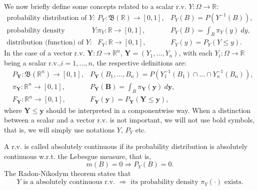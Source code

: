 We now briefly define some concepts related to a scalar r.v. $Y:\Omega\rightarrow\mathbb{R}$:
\begin{eqnarray*}
\text{probability distribution of }                      Y: & P_Y:  \mathfrak{B}(\mathbb{R})\rightarrow [0,1], & P_Y(B) = P(Y^{-1}(B)),       \\
\text{probability density (function), if it exists, of } Y: & \pi_Y:             \mathbb{R} \rightarrow [0,1], & P_Y(B) = \int_B \pi_Y(y)~dy, \\
\text{distribution (function) of }                       Y: & F_Y:               \mathbb{R} \rightarrow [0,1], & F_Y(y) = P_Y(Y\leqslant y).
\end{eqnarray*}
In the case of a vector r.v. $\mathbf{Y}:\Omega\rightarrow\mathbb{R}^n$, $\mathbf{Y}=(Y_1,\ldots,Y_n)$,
with each $Y_i:\Omega\rightarrow\mathbb{R}$ being a scalar r.v.,$i=1,\ldots,n$, the respective definitions are:
\begin{eqnarray*}
 & P_{\mathbf{Y}}:  \mathfrak{B}(\mathbb{R}^n)\rightarrow [0,1], & P_{\mathbf{Y}}(B_1,\ldots,B_n) = P(Y_1^{-1}(B_1)\cap\ldots\cap Y_n^{-1}(B_n)), \\
 & \pi_{\mathbf{Y}}:             \mathbb{R}^n \rightarrow [0,1], & P_{\mathbf{Y}}(\mathbf{B}) = \int_B \pi_{\mathbf{Y}}(\mathbf{y})~d\mathbf{y}, \\
 & F_{\mathbf{Y}}:               \mathbb{R}^n \rightarrow [0,1], & F_{\mathbf{Y}}(\mathbf{y}) = P_{\mathbf{Y}}(\mathbf{Y}\leqslant\mathbf{y}),
\end{eqnarray*}
where $\mathbf{Y}\leqslant\mathbf{y}$ should be interpreted in a componentwise way.
When a distinction between a scalar and a vector r.v. is not important, we will not use bold symbols, that is, we will simply use notations $Y$, $P_Y$ etc.

A r.v. is called absolutely continuous if its probability distribution is absolutely continuous w.r.t. the Lebesgue measure, that is,
\begin{equation*}
m(B) = 0 \Rightarrow P_Y(B) = 0.
\end{equation*}
The Radon-Nikodym theorem \cite{KaSo05} states that
\begin{equation}\label{eq-radon-nik}
Y\text{ is a absolutely continuous r.v. }\Rightarrow\text{ its probability density }\pi_Y(\cdot)\text{ exists}.
\end{equation}

